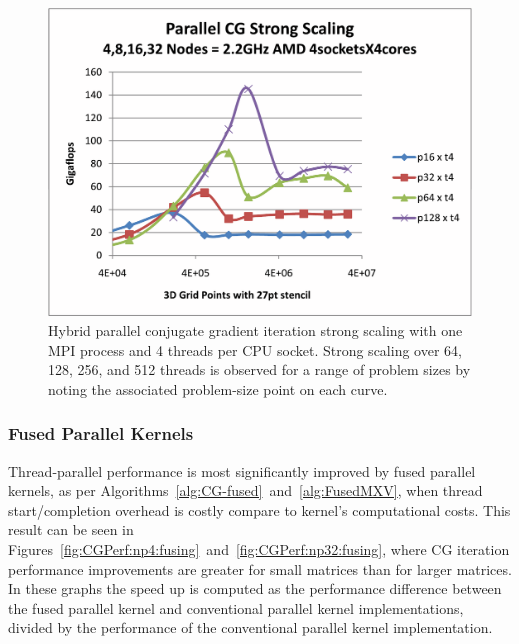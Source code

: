 \begin{figure}[h]
\center
\includegraphics[viewport=1in 0.5in 8.5in 6.5in,angle=0,scale=0.5]{figures/test-hhpccg-intel-11-1-mpi-exe-scaling-no-overlap-2}
\caption{Hybrid parallel conjugate gradient iteration strong scaling with one MPI process and 4 threads per CPU socket.  Strong scaling over 64, 128, 256, and 512 threads is observed for a range of problem sizes by noting the associated problem-size point on each curve.}
\label{fig:CGPerf:scaling}
\end{figure}


\clearpage

\subsubsection{Fused Parallel Kernels}

Thread-parallel performance is most significantly improved by fused parallel kernels,
as per Algorithms~\ref{alg:CG-fused}~and~\ref{alg:FusedMXV},
when thread start/completion overhead is costly compare to kernel's computational costs.
%
This result can be seen in Figures~\ref{fig:CGPerf:np4:fusing}~and~\ref{fig:CGPerf:np32:fusing},
where CG iteration performance improvements are greater for small matrices than for larger matrices.
%
In these graphs the speed up is computed as the performance difference between the fused parallel kernel and conventional parallel kernel implementations, divided by the performance of the conventional parallel kernel implementation.


